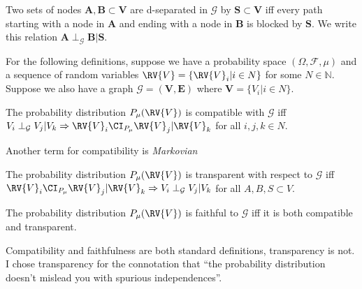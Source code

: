 \begin{definition}[d-separation]\label{def:dsep}
Two sets of nodes $\mathbf{A},\mathbf{B}\subset \mathbf{V}$ are d-separated in $\mathcal{G}$ by $\mathbf{S}\subset \mathbf{V}$ iff every path starting with a node in $\mathbf{A}$ and ending with a node in $\mathbf{B}$ is blocked by $\mathbf{S}$. We write this relation $\mathbf{A} \perp_{\mathcal{G}} \mathbf{B} | \mathbf{S}$.
\end{definition}


For the following definitions, suppose we have a probability space $(\Omega,\mathcal{F},\mu)$ and a sequence of random variables $\RV{V}=\{\RV{V}_i|i\in N\}$ for some $N\in\mathbb{N}$. Suppose we also have a graph $\mathcal{G}=(\mathbf{V},\mathbf{E})$ where $\mathbf{V}=\{V_i|i\in N\}$.

\begin{definition}[Compatibility]\label{def:compatibility}
The probability distribution $P_\mu(\RV{V})$ is compatible with $\mathcal{G}$ iff $V_i\perp_{\mathcal{G}} V_j |V_k \Rightarrow \RV{V}_i\CI_{P_\mu} \RV{V}_j | \RV{V}_k$ for all $i,j,k \in N$.

Another term for compatibility is \emph{Markovian}
\end{definition}

\begin{definition}[Transparency]
The probability distribution $P_\mu(\RV{V})$ is transparent with respect to $\mathcal{G}$ iff $\RV{V}_i\CI_{P_\mu} \RV{V}_j | \RV{V}_k \Rightarrow V_i\perp_{\mathcal{G}} V_j |V_k$ for all $A,B,S\subset V$.
\end{definition}

\begin{definition}[Faithfulness]\label{def:faithfulness}
The probability distribution $P_\mu(\RV{V})$ is faithful to $\mathcal{G}$ iff it is both compatible and transparent.
\end{definition}

\begin{remark}
Compatibility and faithfulness are both standard definitions, transparency is not. I chose transparency for the connotation that ``the probability distribution doesn't mislead you with spurious independences''.
\end{remark}
















